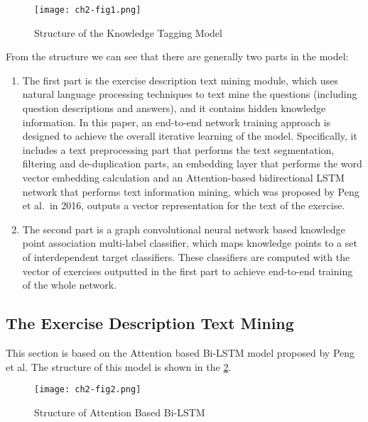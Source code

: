 \begin{figure}[h]
	\centering
	\texttt{[image: ch2-fig1.png]}
	\caption{Structure of the Knowledge Tagging Model}\label{ch2-fig1}
\end{figure}




From the structure we can see that there are generally two parts in the model:
\begin{enumerate}
	\item The first part is the exercise description text mining module, which uses natural language processing techniques to text mine the questions (including question descriptions and answers), and it contains hidden knowledge information. In this paper, an end-to-end network training approach is designed to achieve the overall iterative learning of the model. Specifically, it includes a text preprocessing part that performs the text segmentation, filtering and de-duplication parts, an embedding layer that performs the word vector embedding calculation and an Attention-based bidirectional LSTM network that performs text information mining, which was proposed by Peng et al.\ in 2016\cite{zhou2016attention}, outputs a vector representation for the text of the exercise.
	\item The second part is a graph convolutional neural network based knowledge point association multi-label classifier, which maps knowledge points to a set of interdependent target classifiers. These classifiers are computed with the vector of exercises outputted in the first part to achieve end-to-end training of the whole network.
\end{enumerate}


\subsection{The Exercise Description Text Mining}
This section is based on the Attention based Bi-LSTM model proposed by Peng et al. The structure of this model is shown in the \figurename{\ref{ch2-fig2}}.
\begin{figure}[h]
	\centering
	\texttt{[image: ch2-fig2.png]}
	\caption{Structure of Attention Based Bi-LSTM}\label{ch2-fig2}
\end{figure}

